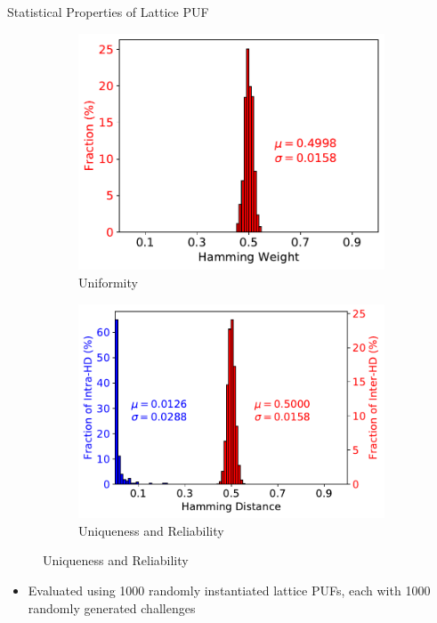 \begin{frame}{Statistical Properties of Lattice PUF}
   \begin{figure}
  \begin{subfigure}[b]{0.45\textwidth}
    \includegraphics[width=\textwidth]{fig/Uniformity.pdf}
    \caption{Uniformity}
    \label{fig:1}
  \end{subfigure}
  \begin{subfigure}[b]{0.5\textwidth}
    \includegraphics[width=\textwidth]{fig/UniquenessReliability.pdf}
    \caption{Uniqueness and Reliability}
    \label{fig:2}
  \end{subfigure}
\end{figure} 
\begin{itemize}
    \item Evaluated using 1000 randomly instantiated lattice PUFs, each with 1000 randomly generated challenges
\end{itemize}
\end{frame}

